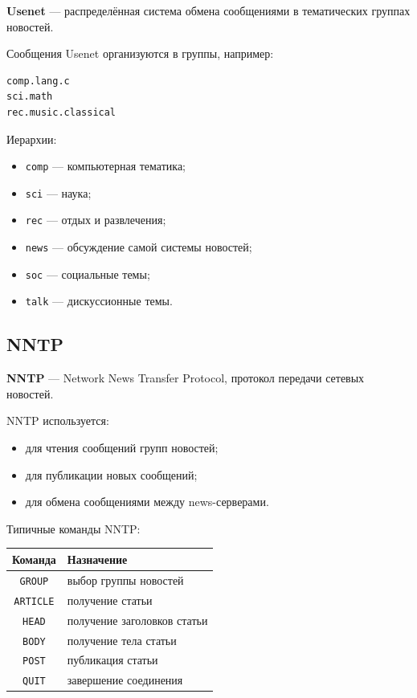 \documentclass[12pt,a4paper]{article}
\begin{document}
\textbf{Usenet} --- распределённая система обмена сообщениями в тематических группах новостей.

Сообщения Usenet организуются в группы, например:
\begin{lstlisting}
comp.lang.c
sci.math
rec.music.classical
\end{lstlisting}

Иерархии:
\begin{itemize}
    \item \texttt{comp} --- компьютерная тематика;
    \item \texttt{sci} --- наука;
    \item \texttt{rec} --- отдых и развлечения;
    \item \texttt{news} --- обсуждение самой системы новостей;
    \item \texttt{soc} --- социальные темы;
    \item \texttt{talk} --- дискуссионные темы.
\end{itemize}

\subsection{NNTP}

\textbf{NNTP} --- Network News Transfer Protocol, протокол передачи сетевых новостей.

NNTP используется:
\begin{itemize}
    \item для чтения сообщений групп новостей;
    \item для публикации новых сообщений;
    \item для обмена сообщениями между news-серверами.
\end{itemize}

Типичные команды NNTP:
\begin{center}
\begin{tabular}{|c|p{8cm}|}
\hline
Команда & Назначение \\
\hline
\texttt{GROUP} & выбор группы новостей \\
\hline
\texttt{ARTICLE} & получение статьи \\
\hline
\texttt{HEAD} & получение заголовков статьи \\
\hline
\texttt{BODY} & получение тела статьи \\
\hline
\texttt{POST} & публикация статьи \\
\hline
\texttt{QUIT} & завершение соединения \\
\hline
\end{tabular}
\end{center}
\end{document}

